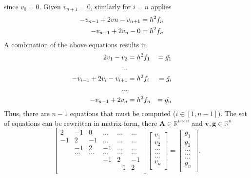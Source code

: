 \documentclass[%
oneside,                 %
final,                   %
10pt]{article}
\newcommand{\R}{\mathbb{R}}
\begin{document}
since $v_0=0$. Given $v_{n+1}=0$, similarly for $i=n$ applies
\begin{equation}
\begin{aligned}
  -v_{n-1}+2vn - v_{n+1}&= h^2f_n  \hspace{0.5cm} \\
 -v_{n-1}+ 2v_n - 0&= h^2f_n  \hspace{0.5cm} 
\end{aligned}
\end{equation}
A combination of the above equations results in 
\begin{equation}
\begin{aligned}
  2v_1 - v_{2}&= h^2f_1 & = \tilde{g_1}  \hspace{0.5cm} \\
  ...\\
  -v_{i-1}+2v_i - v_{i+1}&= h^2f_i &= \tilde{g_i}  \hspace{0.5cm} \\
  ...\\
 -v_{n-1}+ 2v_n &= h^2f_n &= \tilde{g_n}  \hspace{0.5cm} 
\end{aligned}
\end{equation}
Thus, there are $n-1$ equations that must be computed ($i \in [1,n-1])$.
The set of equations can be rewritten in matrix-form, there $ \mathbf{A} \in \R^{n \times n} $ and $ \mathbf{v}, \mathbf{g} \in \R^{n}$
\[
     \begin{bmatrix}
                           2& -1 & 0 &\dots   & \dots &\dots \\
                           -1 & 2 & -1 &\dots &\dots &\dots \\
                           & -1 & 2 & -1 & \dots & \dots \\
                           & \dots   & \dots &\dots   &\dots & \dots \\
                           &   &  &-1  &2& -1 \\
                           &    &  &   &-1 & 2 \\
                      \end{bmatrix}\begin{bmatrix}
                           v_1\\
                           v_2\\
                           \dots \\
                          \dots  \\
                          \dots \\
                           v_n\\
                      \end{bmatrix}
  =\begin{bmatrix}
                           g_1\\
                          g_2\\
                           \dots \\
                           \dots \\
                          \dots \\
                           g_n\\
                      \end{bmatrix}.
\]
\end{document}
